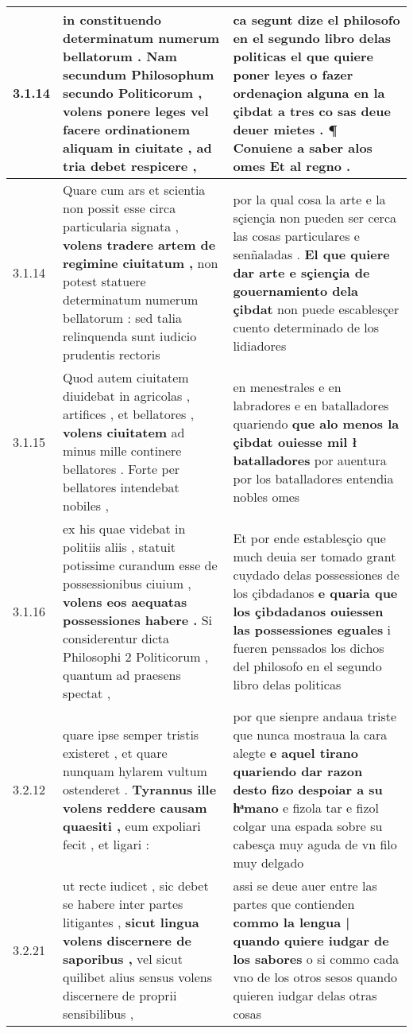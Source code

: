 \begin{tabular}{|p{1cm}|p{6.5cm}|p{6.5cm}|}
3.1.14 & in constituendo determinatum numerum bellatorum . Nam secundum Philosophum secundo Politicorum , \textbf{ volens ponere leges } vel facere ordinationem aliquam in ciuitate , ad tria debet respicere , & ca segunt dize el philosofo en el segundo libro delas politicas \textbf{ el que quiere poner leyes o fazer ordenaçion alguna en la çibdat a tres } co sas deue deuer mietes . ¶ Conuiene a saber alos omes Et al regno . \\\hline
3.1.14 & Quare cum ars et scientia non possit esse circa particularia signata , \textbf{ volens tradere artem de regimine ciuitatum , } non potest statuere determinatum numerum bellatorum : sed talia relinquenda sunt iudicio prudentis rectoris & por la qual cosa la arte e la sçiençia non pueden ser cerca las cosas particulares e senñaladas . \textbf{ El que quiere dar arte e sçiençia de gouernamiento dela çibdat } non puede escablesçer cuento determinado de los lidiadores \\\hline
3.1.15 & Quod autem ciuitatem diuidebat in agricolas , artifices , et bellatores , \textbf{ volens ciuitatem } ad minus mille continere bellatores . Forte per bellatores intendebat nobiles , & en menestrales e en labradores e en batalladores quariendo \textbf{ que alo menos la çibdat ouiesse mil ł batalladores } por auentura por los batalladores entendia nobles omes \\\hline
3.1.16 & ex his quae videbat in politiis aliis , statuit potissime curandum esse de possessionibus ciuium , \textbf{ volens eos aequatas possessiones habere . } Si considerentur dicta Philosophi 2 Politicorum , quantum ad praesens spectat , & Et por ende establesçio que much deuia ser tomado grant cuydado delas possessiones de los çibdadanos \textbf{ e quaria que los çibdadanos ouiessen las possessiones eguales } i fueren penssados los dichos del philosofo en el segundo libro delas politicas \\\hline
3.2.12 & quare ipse semper tristis existeret , et quare nunquam hylarem vultum ostenderet . \textbf{ Tyrannus ille volens reddere causam quaesiti , } eum expoliari fecit , et ligari : & por que sienpre andaua triste que nunca mostraua la cara alegte \textbf{ e aquel tirano quariendo dar razon desto fizo despoiar a su hͣmano } e fizola tar e fizol colgar una espada sobre su cabesça muy aguda de vn filo muy delgado \\\hline
3.2.21 & ut recte iudicet , sic debet se habere inter partes litigantes , \textbf{ sicut lingua volens discernere de saporibus , } vel sicut quilibet alius sensus volens discernere de proprii sensibilibus , & assi se deue auer entre las partes que contienden \textbf{ commo la lengua | quando quiere iudgar de los sabores } o si commo cada vno de los otros sesos quando quieren iudgar delas otras cosas \\\hline

\end{tabular}

